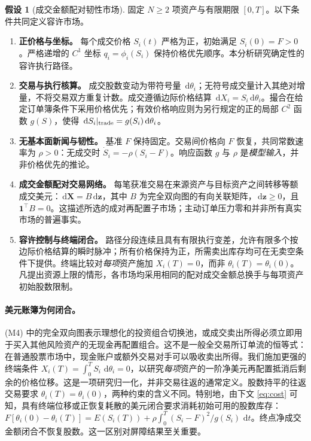 \documentclass[11pt]{article}
\numberwithin{equation}{section}
\theoremstyle{definition}
\newtheorem{assumption}[theorem]{假设}
\theoremstyle{remark}
\newcommand{\dd}{\,\mathrm{d}}
\newcommand{\one}{\mathbf{1}}
\begin{document}
\begin{assumption}[成交金额配对韧性市场]\label{asmp:model}
固定 $N\ge2$ 项资产与有限期限 $[0,T]$。以下条件共同定义容许市场。
\begin{enumerate}[label=\textup{(M\arabic*)},leftmargin=2.9em,itemsep=0.20em]
\item \textbf{正价格与坐标。} 每个成交价格 $S_i(t)$ 严格为正，初始满足 $S_i(0)=F>0$。严格递增的 $C^1$ 坐标 $q_i=\phi_i(S_i)$ 保持价格优先顺序。本分析研究确定性的容许执行路径。
\item \textbf{交易与执行核算。} 成交股数变动为带符号量 $\dd\theta_i$；无符号成交量计入其绝对增量，不将交易双方重复计数。成交遵循边际价格结算 $\dd X_i=S_i\dd\theta_i$。撮合在给定订单簿条件下采用价格优先；有效价格响应则为另行规定的正的局部 $C^2$ 函数 $g(S)$，使得 $\dd S_i|_{\rm trade}=g(S_i)\dd\theta_i$。
\item \textbf{无基本面新闻与韧性。} 基准 $F$ 保持固定。交易间价格向 $F$ 恢复，共同常数速率为 $\rho>0$：无成交时 $\dot S_i=-\rho(S_i-F)$。响应函数 $g$ 与 $\rho$ 是\emph{模型输入}，并非价格优先的推论。
\item \textbf{成交金额配对交易网络。} 每笔获准交易在来源资产与目标资产之间转移等额成交美元：$\dd\bm X=B\dd\bm z$，其中 $B$ 为完全双向图的有向关联矩阵，$\dd\bm z\ge0$，且 $\one^\top B=0$。这描述所选的成对再配置子市场；主动订单压力零和并非所有真实市场的普遍事实。
\item \textbf{容许控制与终端闭合。} 路径分段连续且具有有限执行变差，允许有限多个按边际价格结算的瞬时脉冲；所有价格保持为正，所需卖出库存均可在无卖空条件下提供。终端比较对\emph{每项}资产施加 $X_i(T)=0$，而非 $\theta_i(T)=\theta_i(0)$。凡提出资源上限的情形，各市场均采用相同的配对成交金额总换手与每项资产初始股数限制。
\end{enumerate}
\end{assumption}



\paragraph{美元账簿为何闭合。}
(M4) 中的完全双向图表示理想化的投资组合切换池，或成交卖出所得必须立即用于买入其他风险资产的无现金再配置组合。这不是一般全交易所订单流的恒等式：在普通股票市场中，现金账户或额外交易对手可以吸收卖出所得。我们施加更强的终端条件 $X_i(T)=\int_0^T S_i\,\dd\theta_i=0$，以研究\emph{每项}资产的一阶净美元再配置抵消后剩余的价格位移。这是一项研究归一化，并非交易往返的通常定义。股数持平的往返交易要求 $\theta_i(T)=\theta_i(0)$，两种约束的含义不同。特别地，由下文 \eqref{eq:cost} 可知，具有终端位移或正恢复耗散的美元闭合要求消耗初始可用的股数库存：$F[\theta_i(0)-\theta_i(T)]=E(S_i(T))+\rho\int_0^T(S_i-F)^2/g(S_i)\,\dd t$。终点净成交金额闭合不恢复股数。这一区别对屏障结果至关重要。
\end{document}
